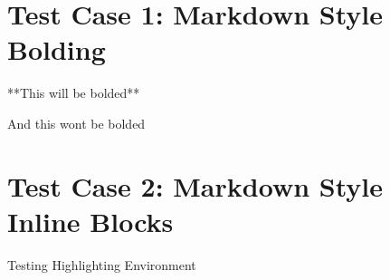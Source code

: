 \documentclass{article}
\begin{document}
\section{Test Case 1: Markdown Style Bolding}

\starON
**This will be bolded**

And this wont be bolded
\starOFF

\section{Test Case 2: Markdown Style Inline Blocks}

\begin{Highlighting}
    Testing Highlighting Environment
\end{Highlighting}

\end{document}
